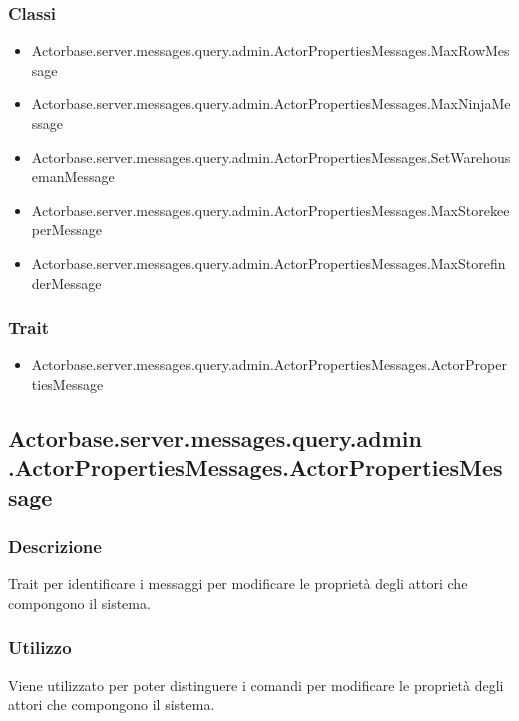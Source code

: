 \documentclass[a4paper]{article}
\begin{document}
			\subsubsection{Classi}
				\begin{itemize}
					\item Actorbase.server.messages.query.admin.ActorPropertiesMessages.MaxRowMessage
					\item Actorbase.server.messages.query.admin.ActorPropertiesMessages.MaxNinjaMessage
					\item Actorbase.server.messages.query.admin.ActorPropertiesMessages.SetWarehousemanMessage
					\item Actorbase.server.messages.query.admin.ActorPropertiesMessages.MaxStorekeeperMessage
					\item Actorbase.server.messages.query.admin.ActorPropertiesMessages.MaxStorefinderMessage
				\end{itemize}
				
			\subsubsection{Trait}
				\begin{itemize}
					\item Actorbase.server.messages.query.admin.ActorPropertiesMessages.ActorPropertiesMessage
				\end{itemize}
		
		\subsection{Actorbase.server.messages.query.admin \newline .ActorPropertiesMessages.ActorPropertiesMessage}
			\subsubsection{Descrizione}
				Trait per identificare i messaggi per modificare le proprietà degli attori che compongono il sistema.
				
			\subsubsection{Utilizzo}
				Viene utilizzato per poter distinguere i comandi per modificare le proprietà degli attori che compongono il sistema.
				
\end{document}
